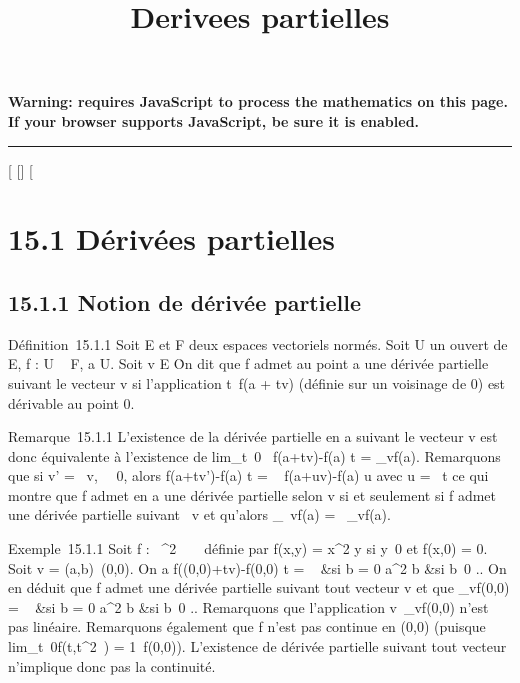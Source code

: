\documentclass[]{article}
\title{Derivees partielles}
\author{}
\date{}
\begin{document}
\maketitle

\textbf{Warning: 
requires JavaScript to process the mathematics on this page.\\ If your
browser supports JavaScript, be sure it is enabled.}

\begin{center}\rule{3in}{0.4pt}\end{center}

[
[]
[

\section{15.1 Dérivées partielles}

\subsection{15.1.1 Notion de dérivée partielle}

Définition~15.1.1 Soit E et F deux espaces vectoriels normés. Soit U un
ouvert de E, f : U \rightarrow~ F, a \in U. Soit v \in E
\diagdown\0\. On dit que f admet au point a
une dérivée partielle suivant le vecteur v si l'application
t\mapsto~f(a + tv) (définie sur un voisinage de 0)
est dérivable au point 0.

Remarque~15.1.1 L'existence de la dérivée partielle en a suivant le
vecteur v est donc équivalente à l'existence de
lim_t\rightarrow~0~ f(a+tv)-f(a)
\over t = \partial_vf(a). Remarquons que si v' = \lambda~v,
\lambda~\neq~0, alors  f(a+tv')-f(a)
\over t = \lambda~ f(a+uv)-f(a) \over u
avec u = \lambda~t ce qui montre que f admet en a une dérivée partielle selon v
si et seulement si f admet une dérivée partielle suivant \lambda~v et qu'alors
\partial_\lambda~vf(a) = \lambda~\partial_vf(a).

Exemple~15.1.1 Soit f : ~^2 \rightarrow~ ~ définie par f(x,y) =
x^2 \over y si
y\neq~0 et f(x,0) = 0. Soit v =
(a,b)\neq~(0,0). On a  f((0,0)+tv)-f(0,0)
\over t = \left \
 &si b = 0 \cr 
a^2 \over b &si
b\neq~0  \right .. On en déduit
que f admet une dérivée partielle suivant tout vecteur v et que
\partial_vf(0,0) = \left \
 &si b = 0 \cr 
a^2 \over b &si
b\neq~0  \right .. Remarquons
que l'application v\mapsto~\partial_vf(0,0) n'est
pas linéaire. Remarquons également que f n'est pas continue en (0,0)
(puisque lim_t\rightarrow~0f(t,t^2~) =
1\neq~f(0,0)). L'existence de dérivée partielle
suivant tout vecteur n'implique donc pas la continuité.
\end{document}

